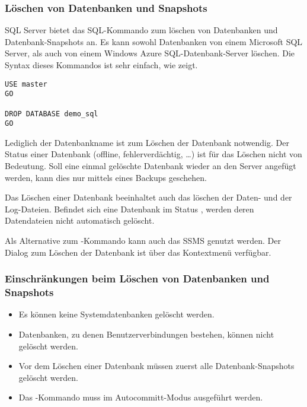         \subsubsection{Löschen von Datenbanken und Snapshots}
          SQL Server bietet das SQL-Kommando  zum
          löschen von Datenbanken und Datenbank-Snapshots an. Es kann sowohl Datenbanken
          von einem Microsoft SQL Server, als auch von einem Windows Azure SQL-Datenbank-Server löschen.
          Die Syntax dieses Kommandos ist sehr einfach, wie 
          zeigt.
          \begin{lstlisting}[language=ms_sql,caption={Löschen der
            Datenbank demo\_sql},label=admin03_25]
USE master 
GO

DROP DATABASE demo_sql
GO 
          \end{lstlisting}
          Lediglich der Datenbankname ist zum Löschen der Datenbank notwendig. Der
          Status einer Datenbank (offline, fehlerverdächtig, \ldots) ist für das
          Löschen nicht von Bedeutung. Soll eine einmal gelöschte Datenbank wieder
          an den Server angefügt werden, kann dies nur mittels eines Backups
          geschehen.
          \begin{merke}
            Das Löschen einer Datenbank beeinhaltet auch das löschen der
            Daten- und der Log-Dateien. Befindet sich eine Datenbank im Status
            , werden deren Datendateien nicht automatisch
            gelöscht.
          \end{merke}
          Als Alternative zum -Kommando kann auch
          das SSMS genutzt werden. Der Dialog zum Löschen der Datenbank ist über
          das Kontextmenü verfügbar.
          \subsubsection{Einschränkungen beim Löschen
          von Datenbanken und Snapshots}
          \begin{itemize}
              \item Es können keine Systemdatenbanken gelöscht werden.
              \item Datenbanken, zu denen Benutzerverbindungen bestehen, können
              nicht gelöscht werden.
              \item Vor dem Löschen einer Datenbank müssen zuerst alle
              Datenbank-Snapshots gelöscht werden.
              \item Das -Kommando muss im
              Autocommitt-Modus ausgeführt werden.
          \end{itemize}
